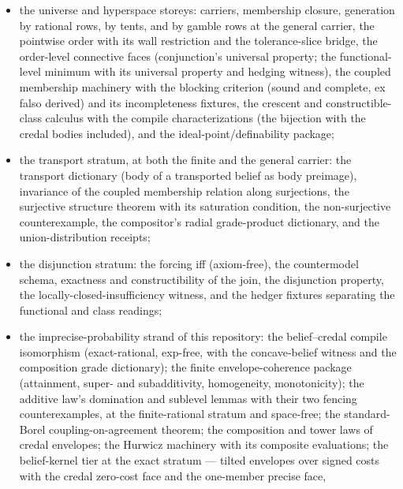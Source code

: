 \begin{itemize}
  the speed-row and
  directedness fixtures and the Lipschitz-arc reading; the
  one-point compactification correspondence; the capacity
  presentation (basis,
  second countability, measure determination, separation, the
  frame form, and the two boundary fixtures); and class descent
  with constructibility in both directions;
\item the universe and hyperspace storeys: carriers, membership
  closure,
  generation by rational rows, by tents, and by gamble rows at the
  general carrier, the pointwise order
  with its wall restriction and the tolerance-slice bridge,
  the order-level connective faces (conjunction's universal
  property; the functional-level minimum with its universal
  property and hedging witness), the coupled membership machinery
  with the blocking criterion (sound and complete, ex falso derived)
  and its incompleteness fixtures, the crescent and
  constructible-class calculus with the compile characterizations
  (the bijection with the credal bodies included),
  and the ideal-point/definability package;
\item the transport stratum, at both the finite and the general
  carrier: the transport dictionary
  (body of a transported belief as body preimage), invariance of
  the coupled membership relation along surjections, the surjective
  structure theorem with its saturation
  condition, the non-surjective counterexample, the compositor's
  radial grade-product dictionary, and the union-distribution
  receipts;
\item the disjunction stratum: the forcing iff (axiom-free), the
  countermodel schema, exactness and constructibility of the
  join, the disjunction property, the
  locally-closed-insufficiency witness, and the hedger fixtures
  separating the functional and class readings;
\item the imprecise-probability strand of this repository: the
  belief--credal compile isomorphism (exact-rational, exp-free,
  with the concave-belief witness and the composition grade
  dictionary); the finite envelope-coherence package (attainment,
  super- and subadditivity, homogeneity, monotonicity); the
  additive law's domination and sublevel lemmas with their two
  fencing counterexamples, at the finite-rational stratum and
  space-free; the standard-Borel coupling-on-agreement theorem; the
  composition and tower laws of credal envelopes; the Hurwicz
  machinery with its composite evaluations; the belief-kernel
  tier at the exact stratum --- tilted envelopes over signed costs
  with the credal zero-cost face and the one-member precise face,

\end{itemize}
